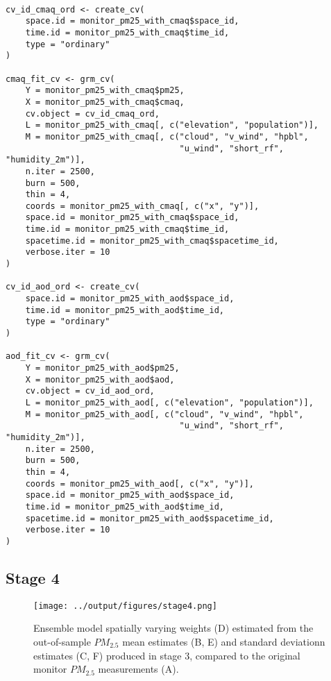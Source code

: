 \documentclass[12pt]{article}
\begin{document}
\begin{lstlisting}

cv_id_cmaq_ord <- create_cv(
    space.id = monitor_pm25_with_cmaq$space_id,
    time.id = monitor_pm25_with_cmaq$time_id, 
    type = "ordinary"
)

cmaq_fit_cv <- grm_cv(
    Y = monitor_pm25_with_cmaq$pm25,
    X = monitor_pm25_with_cmaq$cmaq,
    cv.object = cv_id_cmaq_ord,
    L = monitor_pm25_with_cmaq[, c("elevation", "population")],
    M = monitor_pm25_with_cmaq[, c("cloud", "v_wind", "hpbl", 
                                   "u_wind", "short_rf", "humidity_2m")],
    n.iter = 2500,
    burn = 500,
    thin = 4,
    coords = monitor_pm25_with_cmaq[, c("x", "y")],
    space.id = monitor_pm25_with_cmaq$space_id,
    time.id = monitor_pm25_with_cmaq$time_id,
    spacetime.id = monitor_pm25_with_cmaq$spacetime_id,
    verbose.iter = 10
)

cv_id_aod_ord <- create_cv(
    space.id = monitor_pm25_with_aod$space_id,
    time.id = monitor_pm25_with_aod$time_id,
    type = "ordinary"
)

aod_fit_cv <- grm_cv(
    Y = monitor_pm25_with_aod$pm25,
    X = monitor_pm25_with_aod$aod,
    cv.object = cv_id_aod_ord,
    L = monitor_pm25_with_aod[, c("elevation", "population")],
    M = monitor_pm25_with_aod[, c("cloud", "v_wind", "hpbl", 
                                   "u_wind", "short_rf", "humidity_2m")],
    n.iter = 2500,
    burn = 500,
    thin = 4,
    coords = monitor_pm25_with_aod[, c("x", "y")],
    space.id = monitor_pm25_with_aod$space_id,
    time.id = monitor_pm25_with_aod$time_id,
    spacetime.id = monitor_pm25_with_aod$spacetime_id,
    verbose.iter = 10
)

\end{lstlisting}



\subsection*{Stage 4}

\begin{figure}[ht]
    \centering
    \texttt{[image: ../output/figures/stage4.png]}
    \caption{Ensemble model spatially varying weights (D) estimated from the out-of-sample $PM_{2.5}$ mean estimates (B, E) and standard deviationn estimates (C, F) produced in stage 3, compared to the original monitor $PM_{2.5}$ measurements (A).}
    \label{fig:stage4}
\end{figure}
\end{document}
